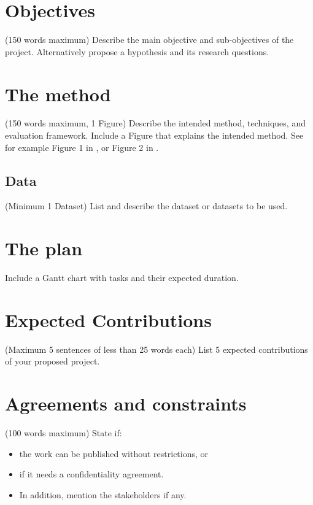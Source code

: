 \documentclass[11pt,a4paper]{article}
\begin{document}
\section{Objectives}
(150 words maximum) Describe the main objective and sub-objectives of the project. Alternatively propose a hypothesis and its research questions. 

\section{The method}
(150 words maximum, 1 Figure) Describe the intended method, techniques, and evaluation framework. Include a Figure that explains the intended method. See for example Figure 1 in , or Figure 2 in .

\subsection{Data}
(Minimum 1 Dataset) List and describe the dataset or datasets to be used.

\section{The plan}
Include a Gantt chart with tasks and their expected duration. 

\section{Expected Contributions}
(Maximum 5 sentences of less than 25 words each) List 5 expected contributions of your proposed project.
 
\section{Agreements and constraints}
(100 words maximum) State if: 

\begin{itemize}
\item the work can be published without restrictions, or 
\item if it needs a confidentiality agreement.
\item In addition, mention the stakeholders if any.
\end{itemize}




\end{document}
